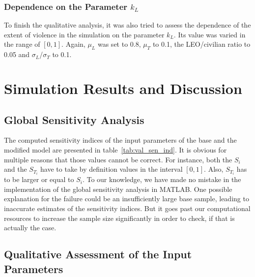 \documentclass[11pt]{article}
\begin{document}
\subsubsection{Dependence on the Parameter $k_L$}
To finish the qualitative analysis, it was also tried to assess the dependence of the extent of violence in the simulation on the parameter $k_L$. Its value was varied in the range of $[0,1]$. Again, $\mu_L$ was set to 0.8, $\mu_T$ to 0.1, the LEO/civilian ratio to 0.05 and $\sigma_L$/$\sigma_T$ to 0.1.

\section{Simulation Results and Discussion}

\subsection{Global Sensitivity Analysis \cite{Saltelli2002,Saltelli2008}}
The computed sensitivity indices of the input parameters of the base and the modified model are presented in table~\ref{tab:val_sen_ind}. It is obvious for multiple reasons that those values cannot be correct. For instance, both the $S_i$ and the $S_{T_i}$ have to take by definition values in the interval $[0,1]$. Also, $S_{T_i}$ has to be larger or equal to $S_i$. To our knowledge, we have made no mistake in the implementation of the global sensitivity analysis in MATLAB. One possible explanation for the failure could be an insufficiently large base sample, leading to inaccurate estimates of the sensitivity indices. But it goes past our computational resources to increase the sample size significantly in order to check, if that is actually the case.

\subsection{Qualitative Assessment of the Input Parameters}
\end{document}
